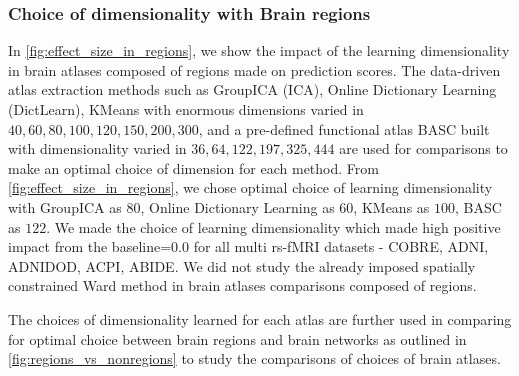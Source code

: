 \documentclass[5p]{elsarticle}
\begin{document}
\subsubsection{Choice of dimensionality with Brain regions}
In \autoref{fig:effect_size_in_regions}, we show the impact of the
learning dimensionality in brain atlases composed of regions
made on prediction scores. The
data-driven atlas extraction methods such as GroupICA (ICA), Online Dictionary
Learning (DictLearn), KMeans with enormous dimensions varied in ${40, 60,
80, 100, 120, 150, 200, 300}$, and a pre-defined functional atlas BASC built with
dimensionality varied in ${36, 64, 122, 197, 325, 444}$ are used for
comparisons to make an optimal choice of dimension for each method. From
\autoref{fig:effect_size_in_regions}, we chose optimal choice of
learning dimensionality with GroupICA as $80$, Online Dictionary Learning as
$60$, KMeans as $100$, BASC as $122$. We made the choice of learning
dimensionality which made high positive impact from the baseline=$0.0$ for
all multi rs-fMRI datasets - COBRE, ADNI, ADNIDOD, ACPI, ABIDE. We did not
study the already imposed spatially constrained Ward method in brain atlases
comparisons composed of regions. 

The choices of dimensionality learned for each atlas are further
used in comparing
for optimal choice between brain regions and brain networks as outlined in
\autoref{fig:regions_vs_nonregions} to study the comparisons of choices of
brain atlases.
\end{document}
